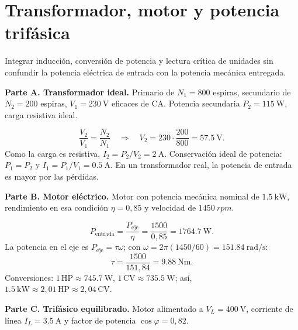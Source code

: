\documentclass[11pt,a4paper]{article}
\newcommand{\ej}[2]{\clearpage\section{#2}}
\begin{document}
\ej{12}{Transformador, motor y potencia trifásica}
\begin{objetivo}Integrar inducción, conversión de potencia y lectura crítica de unidades sin confundir la potencia eléctrica de entrada con la potencia mecánica entregada.\end{objetivo}
\textbf{Parte A. Transformador ideal.} Primario de $N_1=800$ espiras, secundario de $N_2=200$ espiras, $V_1=\SI{230}{\volt}$ eficaces de CA. Potencia secundaria $P_2=\SI{115}{\watt}$, carga resistiva ideal.
\begin{center}\end{center}
\begin{metodo}
\[\frac{V_2}{V_1}=\frac{N_2}{N_1}\quad\Rightarrow\quad V_2=230\cdot\frac{200}{800}=\boxed{\SI{57.5}{\volt}}.\]
Como la carga es resistiva, $I_2=P_2/V_2=\SI{2}{\ampere}$. Conservación ideal de potencia: $P_1=P_2$ y $I_1=P_1/V_1=\SI{0.5}{\ampere}$. En un transformador real, la potencia de entrada es mayor por las pérdidas.
\end{metodo}
\textbf{Parte B. Motor eléctrico.} Motor con potencia mecánica nominal de $\SI{1.5}{\kilo\watt}$, rendimiento en esa condición $\eta=0{,}85$ y velocidad de $\SI{1450}{rpm}$.
\begin{metodo}
\[P_{\mathrm{entrada}}=\frac{P_{\mathrm{eje}}}{\eta}=\frac{1500}{0{,}85}=\boxed{\SI{1764.7}{\watt}}.\]
La potencia en el eje es $P_{\mathrm{eje}}=\tau\omega$; con $\omega=2\pi(1450/60)=\SI{151.84}{\radian\per\second}$:
\[\tau=\frac{1500}{151{,}84}=\boxed{\SI{9.88}{\newton\metre}}.\]
Conversiones: $1\,\mathrm{HP}\approx\SI{745.7}{\watt}$, $1\,\mathrm{CV}\approx\SI{735.5}{\watt}$; así, $\SI{1.5}{\kilo\watt}\approx2{,}01\,\mathrm{HP}\approx2{,}04\,\mathrm{CV}$.
\end{metodo}
\textbf{Parte C. Trifásico equilibrado.} Motor alimentado a $V_L=\SI{400}{\volt}$, corriente de línea $I_L=\SI{3.5}{\ampere}$ y factor de potencia $\cos\varphi=0{,}82$.
\begin{center}\end{center}
\end{document}

